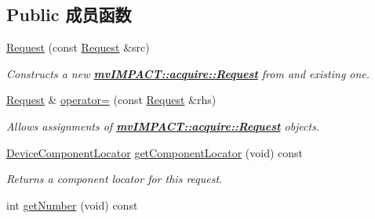 \subsection*{Public 成员函数}
\begin{DoxyCompactItemize}
\item 
\hyperlink{classmv_i_m_p_a_c_t_1_1acquire_1_1_request_a43a70b9653e60efd9ecfb33433518981}{Request} (const \hyperlink{classmv_i_m_p_a_c_t_1_1acquire_1_1_request}{Request} \&src)
\begin{DoxyCompactList}\small\item\em Constructs a new {\bfseries \hyperlink{classmv_i_m_p_a_c_t_1_1acquire_1_1_request}{mv\+I\+M\+P\+A\+C\+T\+::acquire\+::\+Request}} from and existing one. \end{DoxyCompactList}\item 
\hypertarget{classmv_i_m_p_a_c_t_1_1acquire_1_1_request_a634f1302fbb2f3aebe1e3d11ce5c0eb1}{\hyperlink{classmv_i_m_p_a_c_t_1_1acquire_1_1_request}{Request} \& \hyperlink{classmv_i_m_p_a_c_t_1_1acquire_1_1_request_a634f1302fbb2f3aebe1e3d11ce5c0eb1}{operator=} (const \hyperlink{classmv_i_m_p_a_c_t_1_1acquire_1_1_request}{Request} \&rhs)}\label{classmv_i_m_p_a_c_t_1_1acquire_1_1_request_a634f1302fbb2f3aebe1e3d11ce5c0eb1}

\begin{DoxyCompactList}\small\item\em Allows assignments of {\bfseries \hyperlink{classmv_i_m_p_a_c_t_1_1acquire_1_1_request}{mv\+I\+M\+P\+A\+C\+T\+::acquire\+::\+Request}} objects. \end{DoxyCompactList}\item 
\hyperlink{classmv_i_m_p_a_c_t_1_1acquire_1_1_device_component_locator}{Device\+Component\+Locator} \hyperlink{classmv_i_m_p_a_c_t_1_1acquire_1_1_request_a2dc69f50a17c1319ddcbbef5fd3ab2bd}{get\+Component\+Locator} (void) const 
\begin{DoxyCompactList}\small\item\em Returns a component locator for this request. \end{DoxyCompactList}\item 
\hypertarget{classmv_i_m_p_a_c_t_1_1acquire_1_1_request_a57688f576163674a855a07854fa9e7a3}{int \hyperlink{classmv_i_m_p_a_c_t_1_1acquire_1_1_request_a57688f576163674a855a07854fa9e7a3}{get\+Number} (void) const }\label{classmv_i_m_p_a_c_t_1_1acquire_1_1_request_a57688f576163674a855a07854fa9e7a3}


\end{DoxyCompactItemize}
